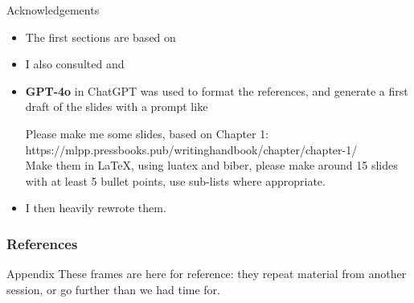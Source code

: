\documentclass[aspectratio=169]{beamer}
\begin{document}

\begin{frame}[allowframebreaks]{Acknowledgements}

  \begin{itemize}
  \item The first sections are based on \citet{writinghandbook}
  \item I also consulted \citet{Reid:2024} and \citet{Krause:2007}
    \framebreak
  \item \textbf{GPT-4o} in ChatGPT \citep{openai-chatgpt-2025-03-14} was used to format the references, and generate a first draft of the slides with a prompt like
    \begin{flushleft}\ttfamily
       Please make me some slides, based on Chapter 1: https://mlpp.pressbooks.pub/writinghandbook/chapter/chapter-1/ \\
Make them in LaTeX, using luatex and biber, please make around 15 slides with at least 5 bullet points, use sub-lists where appropriate. \\
\end{flushleft}
\item I then heavily rewrote them.
  \aicheck
  \end{itemize}

\end{frame}


\begin{frame}[allowframebreaks]
\frametitle{References}
\printbibliography[heading=none]
\end{frame}


\AtBeginSection[]{}
\appendix

\begin{frame}{Appendix}
These frames are here for reference: they repeat material from
another session, or go further than we had time for.
\end{frame}
\end{document}
